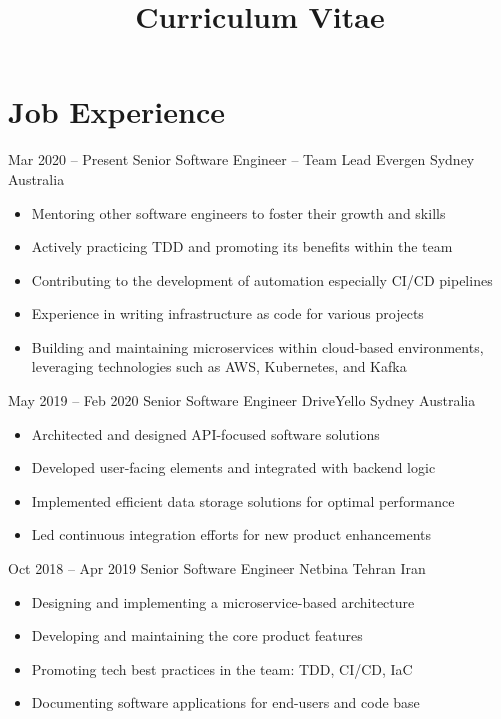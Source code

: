\documentclass[11pt, a4paper, sans]{moderncv}
\title{Curriculum Vitae}
\begin{document}
    \makecvtitle


    \section{Job Experience}\label{sec:job-experience}

    \cventry
    {Mar 2020 -- Present}
    {Senior Software Engineer -- Team Lead}
    {Evergen}
    {Sydney}
    {Australia}
    {
        \begin{itemize}
            \item Mentoring other software engineers to foster their growth and skills
            \item Actively practicing TDD and promoting its benefits within the team
            \item Contributing to the development of automation especially CI/CD pipelines
            \item Experience in writing infrastructure as code for various projects
            \item Building and maintaining microservices within cloud-based environments, leveraging technologies such as AWS, Kubernetes, and Kafka
        \end{itemize}
    }

    \cventry
    {May 2019 -- Feb 2020}
    {Senior Software Engineer}
    {DriveYello}
    {Sydney}
    {Australia}
    {
        \begin{itemize}
            \item Architected and designed API-focused software solutions
            \item Developed user-facing elements and integrated with backend logic
            \item Implemented efficient data storage solutions for optimal performance
            \item Led continuous integration efforts for new product enhancements
        \end{itemize}
    }

    \cventry
    {Oct 2018 -- Apr 2019}
    {Senior Software Engineer}
    {Netbina}
    {Tehran}
    {Iran}
    {
        \begin{itemize}
            \item Designing and implementing a microservice-based architecture
            \item Developing and maintaining the core product features
            \item Promoting tech best practices in the team: TDD, CI/CD, IaC
            \item Documenting software applications for end-users and code base
        \end{itemize}
    }
\end{document}
